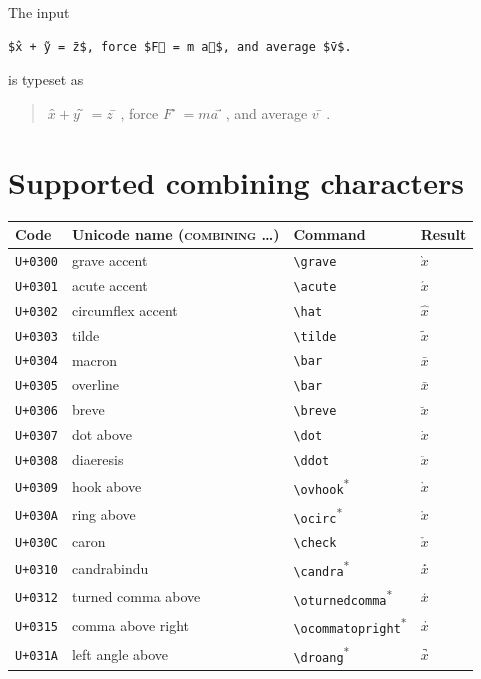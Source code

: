 \documentclass{article}
\begin{document}
\LuaMathAccentsOff
The input
\begin{verbatim}
$x̂ + ỹ = z̄$, force $F⃗ = m a⃗$, and average $v̄$.
\end{verbatim}
\LuaMathAccentsOn
is typeset as
\begin{quote}
$x̂ + ỹ = z̄$, force $F⃗ = m a⃗$, and average $v̄$.
\end{quote}

\section{Supported combining characters}

\begin{longtable}{llll}
\toprule
Code & Unicode name (\textsc{combining} \ldots) & Command & Result\\
\midrule
\endhead
\texttt{U+0300} & grave accent & \verb|\grave| & $\grave{x}$\\
\texttt{U+0301} & acute accent & \verb|\acute| & $\acute{x}$\\
\texttt{U+0302} & circumflex accent & \verb|\hat| & $\hat{x}$\\
\texttt{U+0303} & tilde & \verb|\tilde| & $\tilde{x}$\\
\texttt{U+0304} & macron & \verb|\bar| & $\bar{x}$\\
\texttt{U+0305} & overline & \verb|\bar| & $\bar{x}$\\
\texttt{U+0306} & breve & \verb|\breve| & $\breve{x}$\\
\texttt{U+0307} & dot above & \verb|\dot| & $\dot{x}$\\
\texttt{U+0308} & diaeresis & \verb|\ddot| & $\ddot{x}$\\
\texttt{U+0309} & hook above & \verb|\ovhook|\textsuperscript{*} & $\ovhook{x}$\\
\texttt{U+030A} & ring above & \verb|\ocirc|\textsuperscript{*} & $\ocirc{x}$\\
\texttt{U+030C} & caron & \verb|\check| & $\check{x}$\\
\texttt{U+0310} & candrabindu & \verb|\candra|\textsuperscript{*} & $\candra{x}$\\
\texttt{U+0312} & turned comma above & \verb|\oturnedcomma|\textsuperscript{*} & $\oturnedcomma{x}$\\
\texttt{U+0315} & comma above right & \verb|\ocommatopright|\textsuperscript{*} & $\ocommatopright{x}$\\
\texttt{U+031A} & left angle above & \verb|\droang|\textsuperscript{*} & $\droang{x}$\\

\end{longtable}
\end{document}
